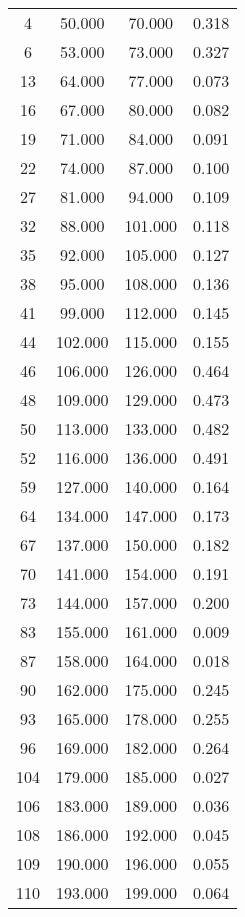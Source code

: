 % 
\begin{tabular}{cccc}
  \hline
  \hline
4 & 50.000 & 70.000 & 0.318 \\ 
  6 & 53.000 & 73.000 & 0.327 \\ 
  13 & 64.000 & 77.000 & 0.073 \\ 
  16 & 67.000 & 80.000 & 0.082 \\ 
  19 & 71.000 & 84.000 & 0.091 \\ 
  22 & 74.000 & 87.000 & 0.100 \\ 
  27 & 81.000 & 94.000 & 0.109 \\ 
  32 & 88.000 & 101.000 & 0.118 \\ 
  35 & 92.000 & 105.000 & 0.127 \\ 
  38 & 95.000 & 108.000 & 0.136 \\ 
  41 & 99.000 & 112.000 & 0.145 \\ 
  44 & 102.000 & 115.000 & 0.155 \\ 
  46 & 106.000 & 126.000 & 0.464 \\ 
  48 & 109.000 & 129.000 & 0.473 \\ 
  50 & 113.000 & 133.000 & 0.482 \\ 
  52 & 116.000 & 136.000 & 0.491 \\ 
  59 & 127.000 & 140.000 & 0.164 \\ 
  64 & 134.000 & 147.000 & 0.173 \\ 
  67 & 137.000 & 150.000 & 0.182 \\ 
  70 & 141.000 & 154.000 & 0.191 \\ 
  73 & 144.000 & 157.000 & 0.200 \\ 
  83 & 155.000 & 161.000 & 0.009 \\ 
  87 & 158.000 & 164.000 & 0.018 \\ 
  90 & 162.000 & 175.000 & 0.245 \\ 
  93 & 165.000 & 178.000 & 0.255 \\ 
  96 & 169.000 & 182.000 & 0.264 \\ 
  104 & 179.000 & 185.000 & 0.027 \\ 
  106 & 183.000 & 189.000 & 0.036 \\ 
  108 & 186.000 & 192.000 & 0.045 \\ 
  109 & 190.000 & 196.000 & 0.055 \\ 
  110 & 193.000 & 199.000 & 0.064 \\ 
   \hline
\end{tabular}
